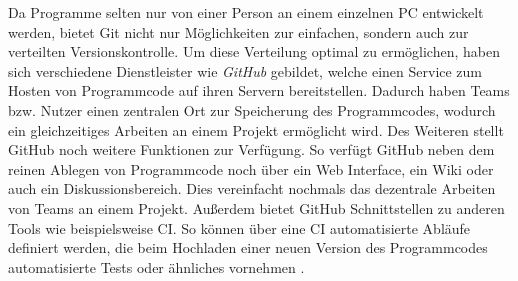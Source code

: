 Da Programme selten nur von einer Person an einem einzelnen PC entwickelt
werden, bietet Git nicht nur Möglichkeiten zur einfachen, sondern auch zur
verteilten Versionskontrolle. Um diese Verteilung optimal zu ermöglichen, haben
sich verschiedene Dienstleister wie \textit{GitHub} gebildet, welche einen
Service zum Hosten von Programmcode auf ihren Servern bereitstellen. Dadurch
haben Teams bzw. Nutzer einen zentralen Ort zur Speicherung des Programmcodes,
wodurch ein gleichzeitiges Arbeiten an einem Projekt ermöglicht wird. Des
Weiteren stellt GitHub noch weitere Funktionen zur Verfügung. So verfügt GitHub
neben dem reinen Ablegen von Programmcode noch über ein Web Interface, ein Wiki
oder auch ein Diskussionsbereich. Dies vereinfacht nochmals das dezentrale
Arbeiten von Teams an einem Projekt. Außerdem bietet GitHub Schnittstellen zu
anderen Tools wie beispielsweise \ac{CI}. So können über eine \ac{CI}
automatisierte Abläufe definiert werden, die beim Hochladen einer neuen Version
des Programmcodes automatisierte Tests oder ähnliches vornehmen
\autocite{bell_2014}.  


